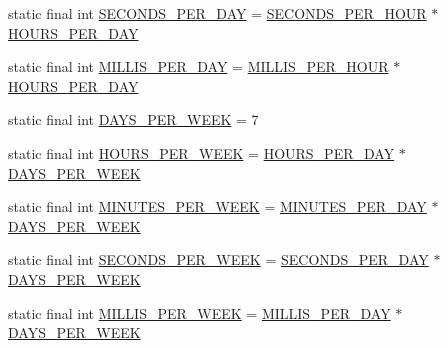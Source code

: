 \begin{DoxyCompactItemize}
\item 
static final int \hyperlink{classorg_1_1joda_1_1time_1_1_date_time_constants_a9563adbae20b30723a374befd0d2c7be}{S\-E\-C\-O\-N\-D\-S\-\_\-\-P\-E\-R\-\_\-\-D\-A\-Y} = \hyperlink{classorg_1_1joda_1_1time_1_1_date_time_constants_ae2282313c878e3f3ad90d3e24c665ed0}{S\-E\-C\-O\-N\-D\-S\-\_\-\-P\-E\-R\-\_\-\-H\-O\-U\-R} $\ast$ \hyperlink{classorg_1_1joda_1_1time_1_1_date_time_constants_a7f1596f04a1286361388fba599d75034}{H\-O\-U\-R\-S\-\_\-\-P\-E\-R\-\_\-\-D\-A\-Y}
\item 
static final int \hyperlink{classorg_1_1joda_1_1time_1_1_date_time_constants_a47be2ee9ec748dc2dad2d655ab359f55}{M\-I\-L\-L\-I\-S\-\_\-\-P\-E\-R\-\_\-\-D\-A\-Y} = \hyperlink{classorg_1_1joda_1_1time_1_1_date_time_constants_a6ebecfcef76cb8117f49b12f8961e47a}{M\-I\-L\-L\-I\-S\-\_\-\-P\-E\-R\-\_\-\-H\-O\-U\-R} $\ast$ \hyperlink{classorg_1_1joda_1_1time_1_1_date_time_constants_a7f1596f04a1286361388fba599d75034}{H\-O\-U\-R\-S\-\_\-\-P\-E\-R\-\_\-\-D\-A\-Y}
\item 
static final int \hyperlink{classorg_1_1joda_1_1time_1_1_date_time_constants_a4656643776dbe23329ecc8ab60f393c9}{D\-A\-Y\-S\-\_\-\-P\-E\-R\-\_\-\-W\-E\-E\-K} = 7
\item 
static final int \hyperlink{classorg_1_1joda_1_1time_1_1_date_time_constants_a482dc021925345fed47cf219455e9963}{H\-O\-U\-R\-S\-\_\-\-P\-E\-R\-\_\-\-W\-E\-E\-K} = \hyperlink{classorg_1_1joda_1_1time_1_1_date_time_constants_a7f1596f04a1286361388fba599d75034}{H\-O\-U\-R\-S\-\_\-\-P\-E\-R\-\_\-\-D\-A\-Y} $\ast$ \hyperlink{classorg_1_1joda_1_1time_1_1_date_time_constants_a4656643776dbe23329ecc8ab60f393c9}{D\-A\-Y\-S\-\_\-\-P\-E\-R\-\_\-\-W\-E\-E\-K}
\item 
static final int \hyperlink{classorg_1_1joda_1_1time_1_1_date_time_constants_a24d3a1fca4ee933195432a72de602d97}{M\-I\-N\-U\-T\-E\-S\-\_\-\-P\-E\-R\-\_\-\-W\-E\-E\-K} = \hyperlink{classorg_1_1joda_1_1time_1_1_date_time_constants_a522a434d1fac486c8cd834d56bfe886b}{M\-I\-N\-U\-T\-E\-S\-\_\-\-P\-E\-R\-\_\-\-D\-A\-Y} $\ast$ \hyperlink{classorg_1_1joda_1_1time_1_1_date_time_constants_a4656643776dbe23329ecc8ab60f393c9}{D\-A\-Y\-S\-\_\-\-P\-E\-R\-\_\-\-W\-E\-E\-K}
\item 
static final int \hyperlink{classorg_1_1joda_1_1time_1_1_date_time_constants_aa66609a4c7ff77c283a14759366b966b}{S\-E\-C\-O\-N\-D\-S\-\_\-\-P\-E\-R\-\_\-\-W\-E\-E\-K} = \hyperlink{classorg_1_1joda_1_1time_1_1_date_time_constants_a9563adbae20b30723a374befd0d2c7be}{S\-E\-C\-O\-N\-D\-S\-\_\-\-P\-E\-R\-\_\-\-D\-A\-Y} $\ast$ \hyperlink{classorg_1_1joda_1_1time_1_1_date_time_constants_a4656643776dbe23329ecc8ab60f393c9}{D\-A\-Y\-S\-\_\-\-P\-E\-R\-\_\-\-W\-E\-E\-K}
\item 
static final int \hyperlink{classorg_1_1joda_1_1time_1_1_date_time_constants_a4a718c97ffddc7d7cffada2d4a5a9562}{M\-I\-L\-L\-I\-S\-\_\-\-P\-E\-R\-\_\-\-W\-E\-E\-K} = \hyperlink{classorg_1_1joda_1_1time_1_1_date_time_constants_a47be2ee9ec748dc2dad2d655ab359f55}{M\-I\-L\-L\-I\-S\-\_\-\-P\-E\-R\-\_\-\-D\-A\-Y} $\ast$ \hyperlink{classorg_1_1joda_1_1time_1_1_date_time_constants_a4656643776dbe23329ecc8ab60f393c9}{D\-A\-Y\-S\-\_\-\-P\-E\-R\-\_\-\-W\-E\-E\-K}
\end{DoxyCompactItemize}
